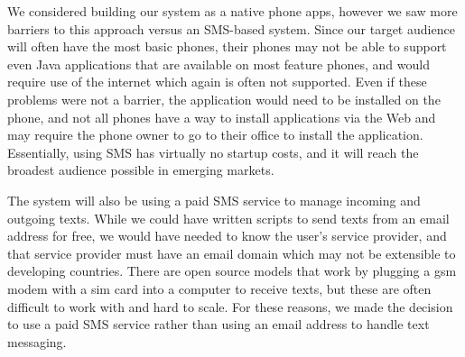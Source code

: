 We considered building our system as a native phone apps, however we saw more barriers to this approach versus an SMS-based system. Since our target audience will often have the most basic phones, their phones may not be able to support even Java applications that are available on most feature phones, and would require use of the internet which again is often not supported. Even if these problems were not a barrier, the application would need to be installed on the phone, and not all phones have a way to install applications via the Web and may require the phone owner to go to their office to install the application. Essentially, using SMS has virtually no startup costs, and it will reach the broadest audience possible in emerging markets.

The system will also be using a paid SMS service to manage incoming and outgoing texts. While we could have written scripts to send texts from an email address for free, we would have needed to know the user’s service provider, and that service provider must have an email domain which may not be extensible to developing countries. There are open source models that work by plugging a gsm modem with a sim card into a computer to receive texts, but these are often difficult to work with and hard to scale. For these reasons, we made the decision to use a paid SMS service rather than using an email address to handle text messaging.
